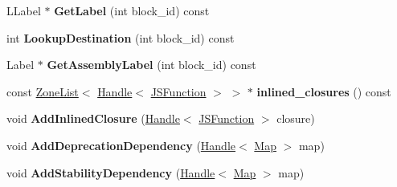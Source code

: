 \begin{DoxyCompactItemize}
\item 
\hypertarget{classv8_1_1internal_1_1_l_chunk_a791820389ac663c9b3d5768ab5ac7699}{}L\+Label $\ast$ {\bfseries Get\+Label} (int block\+\_\+id) const \label{classv8_1_1internal_1_1_l_chunk_a791820389ac663c9b3d5768ab5ac7699}

\item 
\hypertarget{classv8_1_1internal_1_1_l_chunk_a83f3293fd4a47051344878204c0a25dd}{}int {\bfseries Lookup\+Destination} (int block\+\_\+id) const \label{classv8_1_1internal_1_1_l_chunk_a83f3293fd4a47051344878204c0a25dd}

\item 
\hypertarget{classv8_1_1internal_1_1_l_chunk_a9c0e43f44b076f85e30f1c9af1953b2c}{}Label $\ast$ {\bfseries Get\+Assembly\+Label} (int block\+\_\+id) const \label{classv8_1_1internal_1_1_l_chunk_a9c0e43f44b076f85e30f1c9af1953b2c}

\item 
\hypertarget{classv8_1_1internal_1_1_l_chunk_ae8903ee819f1c68824d314525c037fcb}{}const \hyperlink{classv8_1_1internal_1_1_zone_list}{Zone\+List}$<$ \hyperlink{classv8_1_1internal_1_1_handle}{Handle}$<$ \hyperlink{classv8_1_1internal_1_1_j_s_function}{J\+S\+Function} $>$ $>$ $\ast$ {\bfseries inlined\+\_\+closures} () const \label{classv8_1_1internal_1_1_l_chunk_ae8903ee819f1c68824d314525c037fcb}

\item 
\hypertarget{classv8_1_1internal_1_1_l_chunk_aa3551dba0503ab54c710fd34a51e1b3d}{}void {\bfseries Add\+Inlined\+Closure} (\hyperlink{classv8_1_1internal_1_1_handle}{Handle}$<$ \hyperlink{classv8_1_1internal_1_1_j_s_function}{J\+S\+Function} $>$ closure)\label{classv8_1_1internal_1_1_l_chunk_aa3551dba0503ab54c710fd34a51e1b3d}

\item 
\hypertarget{classv8_1_1internal_1_1_l_chunk_a5fd4cf48b99c790a25bfd62087e2e9cc}{}void {\bfseries Add\+Deprecation\+Dependency} (\hyperlink{classv8_1_1internal_1_1_handle}{Handle}$<$ \hyperlink{classv8_1_1internal_1_1_map}{Map} $>$ map)\label{classv8_1_1internal_1_1_l_chunk_a5fd4cf48b99c790a25bfd62087e2e9cc}

\item 
\hypertarget{classv8_1_1internal_1_1_l_chunk_acdabbd4b6e6b4921ab3634fb2379523d}{}void {\bfseries Add\+Stability\+Dependency} (\hyperlink{classv8_1_1internal_1_1_handle}{Handle}$<$ \hyperlink{classv8_1_1internal_1_1_map}{Map} $>$ map)\label{classv8_1_1internal_1_1_l_chunk_acdabbd4b6e6b4921ab3634fb2379523d}


\end{DoxyCompactItemize}
